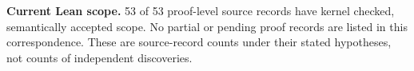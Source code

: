 \textbf{Current Lean scope.} 53 of 53 proof-level source records have kernel checked, semantically accepted scope. No partial or pending proof records are listed in this correspondence. These are source-record counts under their stated hypotheses, not counts of independent discoveries.
